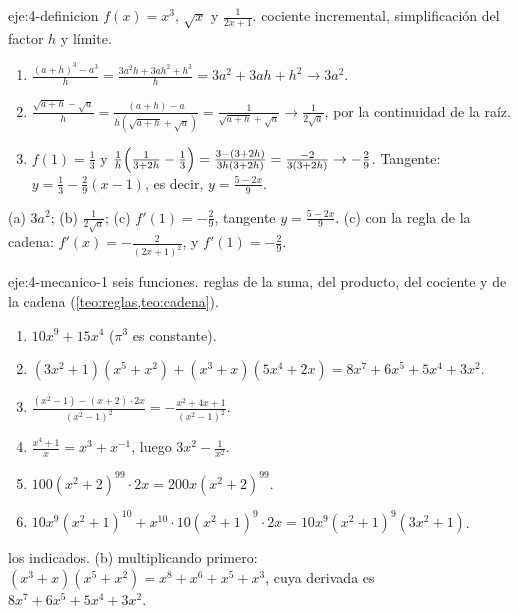 \begin{solucion}{eje:4-definicion}
\datos $f(x)=x^{3}$, $\sqrt x$ y $\frac{1}{2x+1}$.
\planteamiento cociente incremental, simplificación del factor $h$ y límite.
\pasos
\begin{enumerate}[label=(\alph*)]
  \item $\frac{(a+h)^{3}-a^{3}}{h}=\frac{3a^{2}h+3ah^{2}+h^{3}}{h}=3a^{2}+3ah+h^{2}\to3a^{2}$.
  \item $\frac{\sqrt{a+h}-\sqrt a}{h}=\frac{(a+h)-a}{h(\sqrt{a+h}+\sqrt a)}=\frac{1}{\sqrt{a+h}+\sqrt a}\to\frac{1}{2\sqrt a}$, por la continuidad de la raíz.
  \item $f(1)=\frac13$ y $\frac{1}{h}\Bigl(\frac{1}{3+2h}-\frac13\Bigr)=\frac{3-(3+2h)}{3h(3+2h)}=\frac{-2}{3(3+2h)}\to-\frac29$. Tangente: $y=\frac13-\frac29(x-1)$, es decir, $y=\frac{5-2x}{9}$.
\end{enumerate}
\resultado (a) $3a^{2}$; (b) $\frac{1}{2\sqrt a}$; (c) $f'(1)=-\frac29$, tangente $y=\frac{5-2x}{9}$.
\comprobacion (c) con la regla de la cadena: $f'(x)=-\frac{2}{(2x+1)^{2}}$, y $f'(1)=-\frac29$.
\end{solucion}

\begin{solucion}{eje:4-mecanico-1}
\datos seis funciones.
\planteamiento reglas de la suma, del producto, del cociente y de la cadena (\cref{teo:reglas,teo:cadena}).
\pasos
\begin{enumerate}[label=(\alph*)]
  \item $10x^{9}+15x^{4}$ ($\pi^{3}$ es constante).
  \item $(3x^{2}+1)(x^{5}+x^{2})+(x^{3}+x)(5x^{4}+2x)=8x^{7}+6x^{5}+5x^{4}+3x^{2}$.
  \item $\frac{(x^{2}-1)-(x+2)\cdot2x}{(x^{2}-1)^{2}}=-\frac{x^{2}+4x+1}{(x^{2}-1)^{2}}$.
  \item $\frac{x^{4}+1}{x}=x^{3}+x^{-1}$, luego $3x^{2}-\frac{1}{x^{2}}$.
  \item $100(x^{2}+2)^{99}\cdot2x=200x(x^{2}+2)^{99}$.
  \item $10x^{9}(x^{2}+1)^{10}+x^{10}\cdot10(x^{2}+1)^{9}\cdot2x=10x^{9}(x^{2}+1)^{9}(3x^{2}+1)$.
\end{enumerate}
\resultado los indicados.
\comprobacion (b) multiplicando primero: $(x^{3}+x)(x^{5}+x^{2})=x^{8}+x^{6}+x^{5}+x^{3}$, cuya derivada es $8x^{7}+6x^{5}+5x^{4}+3x^{2}$.
\end{solucion}

